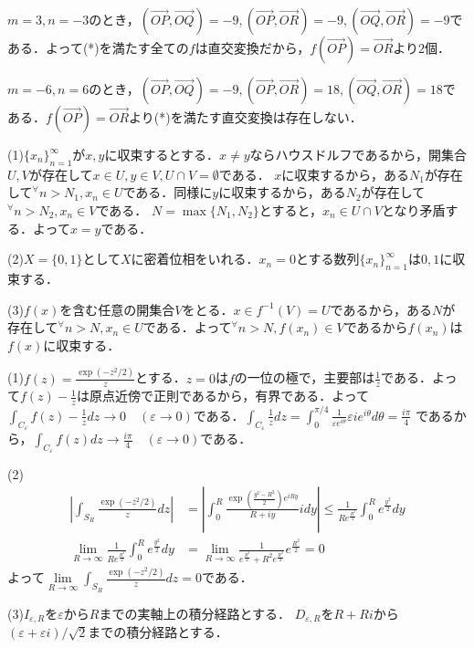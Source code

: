 \documentclass[
		book,
		head_space=20mm,
		foot_space=20mm,
		gutter=10mm,
		line_length=190mm
]{jlreq}
\begin{document}
$m=3,n=-3$のとき，$(\overrightarrow{OP},\overrightarrow{OQ})=-9,(\overrightarrow{OP},\overrightarrow{OR})=-9,(\overrightarrow{OQ},\overrightarrow{OR})=-9$である．よって(*)を満たす全ての$f$は直交変換だから，$f(\overrightarrow{OP})=\overrightarrow{OR}$より$2$個．

$m=-6,n=6$のとき，$(\overrightarrow{OP},\overrightarrow{OQ})=-9,(\overrightarrow{OP},\overrightarrow{OR})=18,(\overrightarrow{OQ},\overrightarrow{OR})=18$である．$f(\overrightarrow{OP})=\overrightarrow{OR}$より(*)を満たす直交変換は存在しない．

(1)$\{x_n\}_{n=1}^\infty$が$x,y$に収束するとする．$x\neq y$ならハウスドルフであるから，開集合$U,V$が存在して$x\in U,y\in V,U\cap V=\emptyset$である．
$x$に収束するから，ある$N_1$が存在して$^\forall n>N_1,x_n\in U$である．同様に$y$に収束するから，ある$N_2$が存在して$^\forall n>N_2,x_n\in V$である．
$N=\max\{N_1,N_2\}$とすると，$x_n\in U\cap V$となり矛盾する．よって$x=y$である．

(2)$X=\{0,1\}$として$X$に密着位相をいれる．$x_n=0$とする数列$\{x_n\}_{n=1}^\infty$は$0,1$に収束する．

(3)$f(x)$を含む任意の開集合$V$をとる．$x \in f^{-1}(V)=U$であるから，ある$N$が存在して$^\forall n>N,x_n\in U$である．よって$^\forall n>N,f(x_n)\in V$であるから$f(x_n)$は$f(x)$に収束する．

(1)$f(z)=\frac{\exp(-z^2/2)}{z}$とする．$z=0$は$f$の一位の極で，主要部は$\frac{1}{z}$である．よって$f(z)-\frac{1}{z}$は原点近傍で正則であるから，有界である．よって$\int_{C_\varepsilon}f(z)-\frac{1}{z}dz\rightarrow 0 \quad (\varepsilon \rightarrow 0)$である．$\int_{C_\varepsilon}\frac{1}{z}dz=\int_0^{\pi/4}\frac{1}{\varepsilon e^{i\theta}}\varepsilon ie^{i\theta}d\theta=\frac{i \pi}{4}$
であるから，$\int_{C_\varepsilon}f(z)dz\rightarrow\frac{i \pi}{4}\quad(\varepsilon\rightarrow0)$である．

(2)\begin{align}
	\left| \int_{S_R}\frac{\exp(-z^2/2)}{z}dz \right|&
	=\left| \int_0^R \frac{\exp\left(\frac{y^2-R^2}{2}\right)e^{iRy}}{R+iy}idy \right|\le \frac{1}{Re^{\frac{R^2}{2}}}\int_0^R e^{\frac{y^2}{2}}dy\\
	\lim_{R\rightarrow \infty} \frac{1}{Re^{\frac{R^2}{2}}}\int_0^R e^{\frac{y^2}{2}}dy&= \lim_{R\rightarrow \infty} \frac{1}{e^{\frac{R^2}{2}}+R^2e^{\frac{R^2}{2}}}e^{\frac{R^2}{2}}=0
\end{align}よって$\lim\limits_{R \to \infty}\int_{S_R}\frac{\exp(-z^2/2)}{z}dz=0$である．

(3)$I_{\varepsilon,R}$を$\varepsilon$から$R$までの実軸上の積分経路とする．
$D_{\varepsilon,R}$を$R+Ri$から$(\varepsilon+\varepsilon i)/\sqrt{2}$までの積分経路とする．
\end{document}

